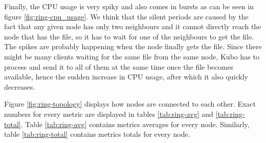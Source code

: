 Finally, the CPU usage is very spiky and also comes in bursts as can be seen in
figure \ref{fig:ring-cpu_usage}. We think that the silent periods are caused by
the fact that any given node has only two neighbours and it cannot directly
reach the node that has the file, so it has to wait for one of the neighbours
to get the file. The spikes are probably happening when the node finally gets
the file. Since there might be many clients waiting for the same file from the
same node, Kubo has to process and send it to all of them at the same time once
the file becomes available, hence the sudden increase in CPU usage, after which
it also quickly decreases.

Figure \ref{fig:ring-topology} displays how nodes are connected to each other.
Exact numbers for every metric are displayed in tables \ref{tab:ring-avg} and
\ref{tab:ring-total}. Table \ref{tab:ring-avg} contains metrics averages for
every node. Similarly, table \ref{tab:ring-total} contains metrics totals for
every node.

